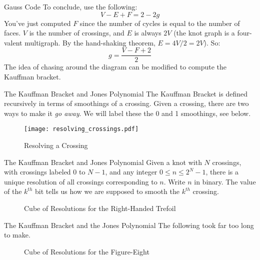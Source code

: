 \documentclass{beamer}
\begin{document}
    \begin{frame}{Gauss Code}
        To conclude, use the following:
        \begin{equation}
            V-E+F=2-2g
        \end{equation}
        You've just computed $F$ since the number of cycles is equal to the
        number of faces. $V$ is the number of crossings, and
        $E$ is always $2V$ (the knot graph is a four-valent multigraph. By the
        hand-shaking theorem, $E=4V/2=2V$). So:
        \begin{equation}
            g=\frac{V-F+2}{2}
        \end{equation}
        The idea of chasing around the diagram can be modified to compute
        the Kauffman bracket.
    \end{frame}
    \begin{frame}{The Kauffman Bracket and Jones Polynomial}
        The Kauffman Bracket is defined recursively in terms of smoothings of a
        crossing. Given a crossing, there are two ways to make it
        \textit{go away}. We will label these the 0 and 1 smoothings, see below.
        \begin{figure}
            \centering
            \texttt{[image: resolving\_crossings.pdf]}
            \caption{Resolving a Crossing}
            \label{fig:resolving_crossing}
        \end{figure}
    \end{frame}
    \begin{frame}{The Kauffman Bracket and Jones Polynomial}
        Given a knot with $N$ crossings, with crossings labeled 0 to $N-1$,
        and any integer $0\leq{n}\leq{2}^{N}-1$, there is a unique resolution of
        all crossings corresponding to $n$. Write $n$ in binary. The value of
        the $k^{th}$ bit tells us how we are supposed to smooth the $k^{th}$
        crossing.
        \begin{figure}
            \centering
            \caption{Cube of Resolutions for the Right-Handed Trefoil}
            \label{fig:trefoil_knot_cube_of_resolutions}
        \end{figure}
    \end{frame}
    \begin{frame}{The Kauffman Bracket and the Jones Polynomial}
        The following took far too long to make.
        \begin{figure}
            \centering
            \caption{Cube of Resolutions for the Figure-Eight}
            \label{fig:figure_eight_knot_cube_of_resolutions}
        \end{figure}
    \end{frame}
\end{document}
